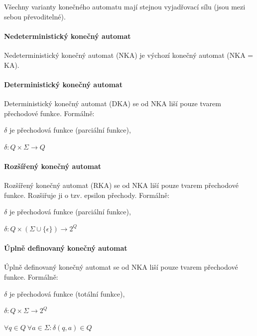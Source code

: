 Všechny varianty konečného automatu mají stejnou vyjadřovací sílu (jsou mezi sebou převoditelné).

\paragraph*{Nedeterministický konečný automat} Nedeterministický konečný automat (NKA) je výchozí konečný automat (NKA = KA).

\paragraph*{Deterministický konečný automat} Deterministický konečný automat (DKA) se od NKA liší pouze tvarem přechodové funkce. Formálně: \begin{compactitem}
    \item $\delta$ je přechodová funkce (parciální funkce), \begin{compactitem}
        \item $\delta : Q \times \Sigma \rightarrow Q$
    \end{compactitem}
\end{compactitem}

\paragraph*{Rozšířený konečný automat} Rozšířený konečný automat (RKA) se od NKA liší pouze tvarem přechodové funkce. Rozšiřuje ji o tzv. epsilon přechody. Formálně: \begin{compactitem}
    \item $\delta$ je přechodová funkce (parciální funkce), \begin{compactitem}
        \item $\delta : Q \times (\Sigma \cup \{ \epsilon \}) \rightarrow 2^Q$
    \end{compactitem}
\end{compactitem}

\paragraph*{Úplně definovaný konečný automat} Úplně definovaný konečný automat se od NKA liší pouze tvarem přechodové funkce. Formálně: \begin{compactitem}
    \item $\delta$ je přechodová funkce (totální funkce), \begin{compactitem}
        \item $\delta : Q \times \Sigma \rightarrow 2^Q$
        \item $\forall q \in Q ~ \forall a \in \Sigma : \delta(q, a) \in Q$
    \end{compactitem}
\end{compactitem}

